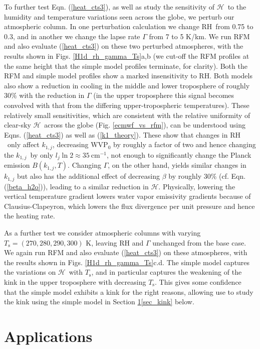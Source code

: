\documentclass{ametsoc}
\newcommand{\eqnref}[1]{(\ref{#1})}
\newcommand{\cminverse}{\ensuremath{\mathrm{cm^{-1}}}}
\newcommand{\Ts}{\ensuremath{T_\mathrm{s}}}
\newcommand{\RH}{\ensuremath{\mathrm{RH}}}
\newcommand{\ch}{\ensuremath{\mathcal{H}}}
\newcommand{\lj}{\ensuremath{l_j}}
\newcommand{\WVP}{\ensuremath{\mathrm{WVP}}}
\newcommand{\konej}{\ensuremath{k_{1,j}}}
\begin{document}
 To further test Eqn. \eqnref{heat_cts3}, as well as study the sensitivity of \ch\ to the humidity and temperature variations seen across the globe, we perturb our atmospheric column. In one perturbation calculation we change \RH\ from 0.75 to 0.3, and in another we change the lapse rate $\Gamma$ from  7 to 5 K/km.  We  run RFM and also evaluate \eqnref{heat_cts3} on these two perturbed atmospheres, with the results shown in Figs. \ref{H1d_rh_gamma_Ts}a,b  (we cut-off the RFM profiles at the same height that the simple model profiles terminate, for clarity). Both the RFM and simple model profiles show a marked insensitivity to \RH. Both models also show a reduction in cooling in the middle and lower troposphere of roughly $30\%$ with the reduction in $\Gamma$ (in the upper troposphere this signal becomes convolved with that from the differing upper-tropospheric temperatures). These relatively small sensitivities, which are consistent with  the relative uniformity of clear-sky \ch\  across the globe (Fig. \ref{ecmwf_vs_rfm}), can be understood using Eqns. \eqnref{heat_cts3} as well as \eqnref{k1_theory}. These show that changes in \RH\ only affect \konej, decreasing $\WVP_0$ by roughly a factor of two and hence changing the \konej\ by only $\lj\ln 2\approx 35\ \cminverse$, not enough to significantly change the Planck emission $B(\konej,T)$. Changing $\Gamma$, on the other hand,  yields similar changes in  $\konej$ but also has the additional effect of decreasing $\beta$ by roughly $30\%$  (cf. Eqn. \eqnref{beta_h2o}), leading to a similar reduction in \ch. Physically, lowering the vertical temperature gradient  lowers  water vapor emissivity gradients because of Clausius-Clapeyron, which lowers the flux divergence per unit pressure and hence the heating rate. 

As a further  test we consider atmospheric columns with varying $\Ts=(270,280,290,300)$ K, leaving $\RH$ and $\Gamma$ unchanged from the base case. We again run RFM and also evaluate \eqnref{heat_cts3} on these atmospheres, with the results shown in Figs. \ref{H1d_rh_gamma_Ts}c.d. The simple model captures the variations on \ch\ with \Ts, and in particular captures the weakening of the kink in the upper troposphere with decreasing \Ts. This gives some confidence that the simple model exhibits a kink for the right reasons, allowing use to study the kink using the simple model in Section \ref{sec_applications}\ref{sec_kink} below.

\section{Applications} \label{sec_applications}
\end{document}
